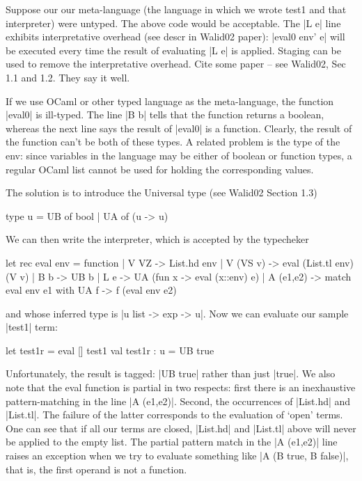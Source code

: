 \documentclass[preprint]{sigplanconf}
\begin{document}
Suppose our our meta-language (the language in which we wrote test1
and that interpreter) were untyped. The above code would be acceptable.
The |L e| line exhibits interpretative overhead (see descr in Walid02
paper): |eval0 env' e| will be executed every time the result of
evaluating |L e| is applied. Staging can be used to remove the
interpretative overhead. Cite some paper -- see Walid02, Sec 1.1 and
1.2. They say it well.

If we use OCaml or other typed language as the meta-language, 
the function |eval0| is ill-typed. The line |B b|
tells that the function returns a boolean, whereas the next line says
the result of |eval0| is a function. Clearly, the result of the
function can't be both of these types. 
A related problem is the type of the env: since variables
in the language may be either of boolean or function types, a regular
OCaml list cannot be used for holding the corresponding values. 

The solution is to introduce the Universal type (see Walid02 Section
1.3)

\begin{code}
  type u = UB of bool | UA of (u -> u)
\end{code}

We can then write the interpreter, which is accepted by the typecheker
\begin{code}
  let rec eval env = function
  | V VZ -> List.hd env
  | V (VS v) -> eval (List.tl env) (V v)
  | B b -> UB b
  | L e -> UA (fun x -> eval (x::env) e)
  | A (e1,e2) -> match eval env e1 with UA f -> f (eval env e2)
\end{code}
and whose inferred type is |u list -> exp -> u|. Now we can evaluate
our sample |test1| term:

\begin{code}
  let test1r = eval [] test1
  val test1r : u = UB true 
\end{code}

Unfortunately, the result is tagged: |UB true| rather than just
|true|. We also note that the eval function is partial in two
respects: first there is an inexhaustive pattern-matching in the 
line |A (e1,e2)|.
Second, the occurrences of |List.hd| and |List.tl|.
The failure of the latter corresponds to the evaluation of `open'
terms. One can see that if all our terms are closed, |List.hd| and
|List.tl| above will never be applied to the empty list. The partial
pattern match in the |A (e1,e2)| line raises an exception when we try to
evaluate something like |A (B true, B false)|, that is, the first
operand is not a function. 
\end{document}

